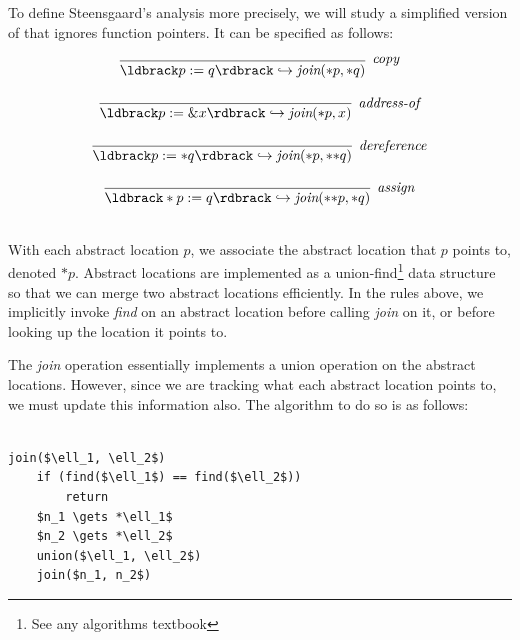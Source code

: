 \documentclass[11pt]{article}
\begin{document}

To define Steensgaard's analysis more precisely, 
we will study a simplified version of that ignores function pointers.  It can be specified as follows:

\[
\begin{array}{c}
\infer[\textit{copy}]
	{\parg{p := q} \hookrightarrow \textit{join}(*p,*q)}
	{}\\[3ex]
	
\infer[\textit{address-of}]
	{\parg{p := \&x} \hookrightarrow \textit{join}(*p,x)}
	{}\\[3ex]
	
\infer[\textit{dereference}]
	{\parg{p := *q} \hookrightarrow \textit{join}(*p,*{*}q)}
	{}\\[3ex]
	
\infer[\textit{assign}]
	{\parg{*p := q} \hookrightarrow \textit{join}(*{*}p,*q)}
	{}\\[3ex]
	
\end{array}
\]

With each abstract location $p$, we associate the abstract location that $p$ points to, denoted $*p$.  Abstract locations are implemented as a union-find\footnote{See any algorithms textbook} data structure so that we can merge two abstract locations efficiently.  In the rules above, we implicitly invoke \textit{find} on an abstract location before calling \textit{join} on it, or before looking up the location it points to.

The \textit{join} operation essentially implements a union operation on the abstract locations.  However, since we are tracking what each abstract location points to, we must update this information also.  The algorithm to do so is as follows:

\newpage

\begin{lstlisting}[mathescape]

join($\ell_1, \ell_2$)
    if (find($\ell_1$) == find($\ell_2$))
        return
    $n_1 \gets *\ell_1$
    $n_2 \gets *\ell_2$
    union($\ell_1, \ell_2$)
    join($n_1, n_2$)

\end{lstlisting}
\end{document}
